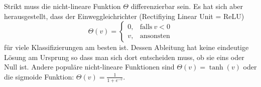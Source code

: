 \documentclass[12pt]{article}
\begin{document}
Strikt muss die nicht-lineare Funktion $\Theta$ differenzierbar
sein. Es hat sich aber herausgestellt, dass der Einweggleichrichter
(Rectifiying Linear Unit = ReLU)
\begin{equation}
  \Theta(v) =
  \begin{cases}
    0, & \text{falls}\ v < 0 \\
    v, & \text{ansonsten}
  \end{cases}
\end{equation}
für viele Klassifizierungen am besten
ist. Dessen Ableitung hat keine eindeutige Lösung am Ursprung so dass man sich dort
entscheiden muss, ob sie eins oder Null ist. Andere populäre nicht-lineare
Funktionen sind $\Theta(v)=\tanh(v)$ oder die sigmoide Funktion: $\Theta(v)=\frac{1}{1+e^{-v}}$.
\end{document}
